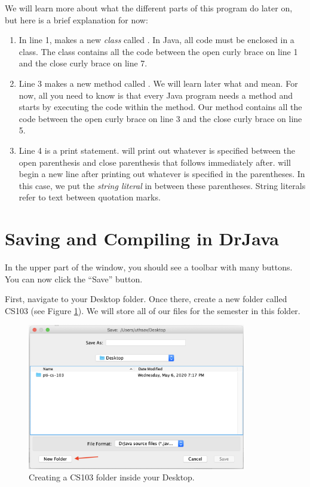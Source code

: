 We will learn more about what the different parts of this program do later on, but here is a brief explanation for now:
\begin{enumerate}
\item In line 1,  makes a new \emph{class} called . In Java, all code must be enclosed in a class. The class contains all the code between the open curly brace \ic{\{} on line 1 and the close curly brace \ic{\}} on line 7.
\item Line 3 makes a new method called . We will learn later what
 and  mean. For now, all you
need to know is that every Java program needs a  method and starts
by executing the code within the  method. Our  method
contains all the code between the open curly brace \ic{\{} on line 3 and the
close curly brace \ic{\}} on line 5.
\item Line 4 is a print statement.  will print out
whatever is specified between the open parenthesis \ic{(} and close
parenthesis\ic{)} that follows immediately after.
 will begin a new line after printing out whatever is specified in the parentheses.
In this case, we
put the \emph{string literal}  in between these parentheses.
String literals refer to text between quotation marks.
\end{enumerate}


\section{Saving and Compiling in DrJava}

In the upper part of the window, you should see a toolbar with many buttons.
You can now click the ``Save'' button. 

First, navigate to your Desktop folder. Once there, create a new folder called CS103 (see Figure \ref{fig:helloworld:sec:saving}). We will store all of our files for the semester in this folder. 

\begin{figure}[ht]
	\centering
	\includegraphics[width=0.85\textwidth]{images/hello_world_saving}
	\caption{Creating a CS103 folder inside your Desktop.}
	\label{fig:helloworld:sec:saving}
\end{figure}

